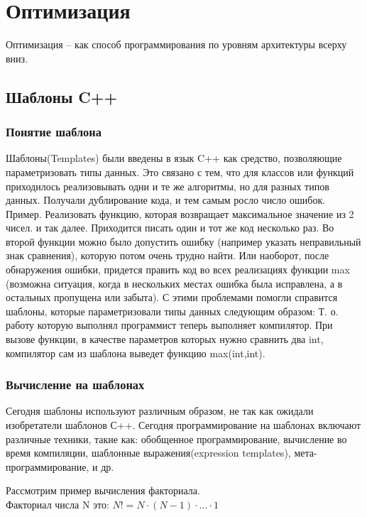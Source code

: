 \newpage
\section{Оптимизация}
Оптимизация -- как способ программирования по уровням архитектуры всерху вниз.

\subsection{Шаблоны C++}

\subsubsection{Понятие шаблона}

Шаблоны(Templates) были введены в язык C++ как средство, позволяющие параметризовать типы данных. Это связано с тем, что для классов или функций приходилось реализовывать одни и те же алгоритмы, но для разных типов данных. Получали дублирование кода, и тем самым росло число ошибок. 
Пример. Реализовать функцию, которая возвращает максимальное значение из 2 чисел.
\noindent
и так далее. Приходится писать один и тот же код несколько раз. Во второй функции можно было допустить ошибку (например указать неправильный знак сравнения), которую потом очень трудно найти. Или наоборот, после обнаружения ошибки, придется править код во всех реализациях функции max (возможна ситуация, когда в нескольких местах ошибка была исправлена, а в остальных пропущена или забыта). С этими проблемами помогли справится шаблоны, которые параметризовали типы данных следующим образом:
Т. о. работу которую выполнял программист теперь выполняет компилятор. При вызове функции, в качестве параметров которых нужно сравнить два int, компилятор сам из шаблона выведет функцию max(int,int).
\subsubsection{Вычисление на шаблонах}
Сегодня шаблоны используют различным образом, не так как ожидали изобретатели
шаблонов С++. Сегодня программирование на шаблонах включают различные техники, такие как: обобщенное программирование, вычисление во время компиляции, шаблонные выражения(expression templates), мета-программирование, и др.

\noindent Рассмотрим пример вычисления факториала. \\
\noindent Факториал числа N это: $N! = N \cdot (N-1) \cdot \dots \cdot 1$


